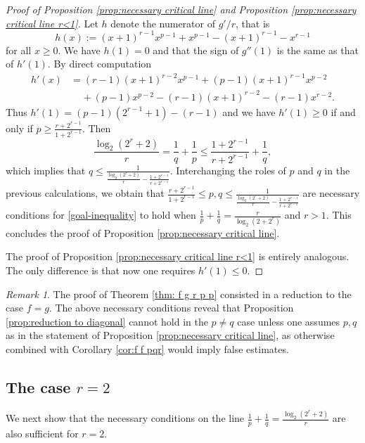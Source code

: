 \documentclass[reqno, 10pt]{amsart}
\theoremstyle{plain}
\numberwithin{equation}{section}
\theoremstyle{definition}
\newtheorem*{induction hypothesis}{Induction hypothesis}
\theoremstyle{remark}
\newtheorem*{remark}{Remark}
\begin{document}
\begin{proof}[Proof of Proposition \ref{prop:necessary critical line} and Proposition \ref{prop:necessary critical line r<1}]
Let $h$ denote the numerator of $g'/r$,  that is $$h(x):=(x+1)^{r-1}x^{p-1}+x^{p-1}-(x+1)^{r-1}-x^{r-1}$$ for all $x\geq0$. We have $h(1)=0$ and that the sign of $g''(1)$ is the same as that of $h'(1)$. By direct computation
\begin{align*}
    h'(x)&=(r-1)(x+1)^{r-2}x^{p-1}+(p-1)(x+1)^{r-1}x^{p-2}\\
    &\ \ \ \ \ +(p-1)x^{p-2}-(r-1)(x+1)^{r-2}-(r-1)x^{r-2}.
\end{align*}
Thus $h'(1)=(p-1)(2^{r-1}+1)-(r-1)$ and we have $h'(1)\geq 0$ if and only if $p\geq \frac{r+2^{r-1}}{1+2^{r-1}}$. Then
$$
\frac{\log_2 (2^r+2)}{r}=\frac{1}{q}+\frac{1}{p}\leq \frac{1+2^{r-1}}{r+2^{r-1}}+\frac{1}{q},
$$
which implies that $q\leq \frac{1}{\frac{\log_2 (2^r+2)}{r}-\frac{1+2^{r-1}}{r+2^{r-1}}}$. Interchanging the roles of $p$ and $q$ in the previous calculations, we obtain that
$\frac{r+2^{r-1}}{1+2^{r-1}}\leq p,q\leq \frac{1}{\frac{\log_2 (2^r+2)}{r}-\frac{1+2^{r-1}}{r+2^{r-1}}}$ are necessary conditions for \eqref{goal-inequality} to hold when $\frac{1}{p}+\frac{1}{q}=\frac{r}{\log_2(2+2^r)}$ and $r>1$. This concludes the proof of Proposition \ref{prop:necessary critical line}.

The proof of Proposition \ref{prop:necessary critical line r<1} is entirely analogous. The only difference is that now one requires $h'(1)\leq 0$.
\end{proof}

\begin{remark}
The proof of Theorem \ref{thm: f g r p p} consisted in a reduction to the case $f=g$. The above necessary conditions reveal that Proposition \ref{prop:reduction to diagonal} cannot hold in the $p \neq q$ case unless one assumes $p,q$ as in the statement of Proposition \ref{prop:necessary critical line}, as otherwise combined with Corollary \ref{cor:f f pqr} would imply false estimates.
\end{remark}


\subsection{The case $r=2$}

We next show that the necessary conditions on the line $\frac{1}{p} + \frac{1}{q}=\frac{\log_2(2^r +2)}{r}$ are also sufficient for $r=2$.
\end{document}
